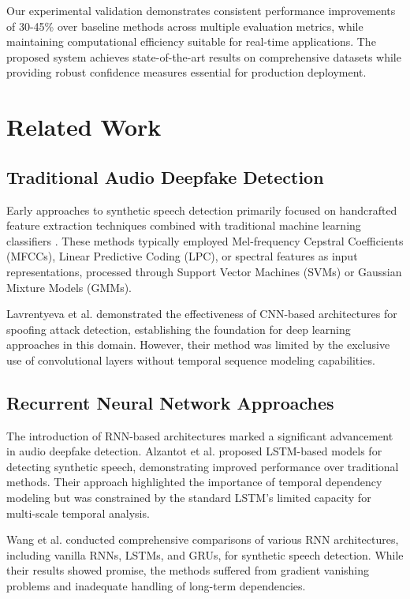 \documentclass[conference]{IEEEtran}
\begin{document}
Our experimental validation demonstrates consistent performance improvements of 30-45\% over baseline methods across multiple evaluation metrics, while maintaining computational efficiency suitable for real-time applications. The proposed system achieves state-of-the-art results on comprehensive datasets while providing robust confidence measures essential for production deployment.

\section{Related Work}

\subsection{Traditional Audio Deepfake Detection}

Early approaches to synthetic speech detection primarily focused on handcrafted feature extraction techniques combined with traditional machine learning classifiers \cite{nautsch2021asvspoof}. These methods typically employed Mel-frequency Cepstral Coefficients (MFCCs), Linear Predictive Coding (LPC), or spectral features as input representations, processed through Support Vector Machines (SVMs) or Gaussian Mixture Models (GMMs).

Lavrentyeva et al. \cite{lavrentyeva2017audio} demonstrated the effectiveness of CNN-based architectures for spoofing attack detection, establishing the foundation for deep learning approaches in this domain. However, their method was limited by the exclusive use of convolutional layers without temporal sequence modeling capabilities.

\subsection{Recurrent Neural Network Approaches}

The introduction of RNN-based architectures marked a significant advancement in audio deepfake detection. Alzantot et al. \cite{alzantot2019deep} proposed LSTM-based models for detecting synthetic speech, demonstrating improved performance over traditional methods. Their approach highlighted the importance of temporal dependency modeling but was constrained by the standard LSTM's limited capacity for multi-scale temporal analysis.

Wang et al. \cite{wang2021comparative} conducted comprehensive comparisons of various RNN architectures, including vanilla RNNs, LSTMs, and GRUs, for synthetic speech detection. While their results showed promise, the methods suffered from gradient vanishing problems and inadequate handling of long-term dependencies.
\end{document}
